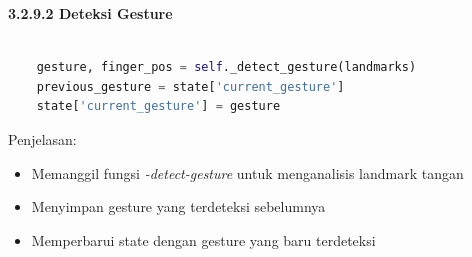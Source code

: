 \documentclass[11pt,a4paper]{article}
\begin{document}
    \noindent\textbf{3.2.9.2 Deteksi Gesture}
    \begin{lstlisting}[language=Python, caption=Deteksi Gesture]
        
    gesture, finger_pos = self._detect_gesture(landmarks)
    previous_gesture = state['current_gesture']
    state['current_gesture'] = gesture
    \end{lstlisting}
    Penjelasan: 
    \begin{itemize}
        \item Memanggil fungsi \textit{-detect-gesture }untuk menganalisis landmark tangan
        \item Menyimpan gesture yang terdeteksi sebelumnya
        \item Memperbarui state dengan gesture yang baru terdeteksi
    \end{itemize}
\end{document}
